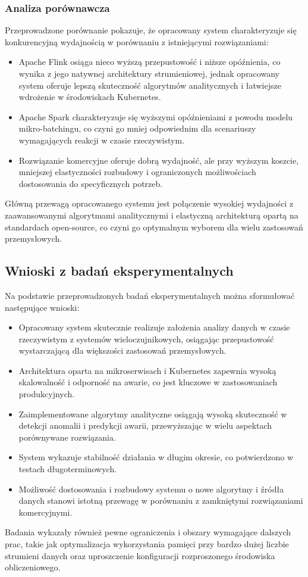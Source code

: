 \subsubsection{Analiza porównawcza}
\label{subsubsec:analiza_porownawcza}

Przeprowadzone porównanie pokazuje, że opracowany system charakteryzuje się konkurencyjną wydajnością w porównaniu z istniejącymi rozwiązaniami:

\begin{itemize}
    \item Apache Flink osiąga nieco wyższą przepustowość i niższe opóźnienia, co wynika z jego natywnej architektury strumieniowej, jednak opracowany system oferuje lepszą skuteczność algorytmów analitycznych i łatwiejsze wdrożenie w środowiskach Kubernetes.
    \item Apache Spark charakteryzuje się wyższymi opóźnieniami z powodu modelu mikro-batchingu, co czyni go mniej odpowiednim dla scenariuszy wymagających reakcji w czasie rzeczywistym.
    \item Rozwiązanie komercyjne oferuje dobrą wydajność, ale przy wyższym koszcie, mniejszej elastyczności rozbudowy i ograniczonych możliwościach dostosowania do specyficznych potrzeb.
\end{itemize}

Główną przewagą opracowanego systemu jest połączenie wysokiej wydajności z zaawansowanymi algorytmami analitycznymi i elastyczną architekturą opartą na standardach open-source, co czyni go optymalnym wyborem dla wielu zastosowań przemysłowych.

\subsection{Wnioski z badań eksperymentalnych}
\label{subsec:wnioski_z_badan}

Na podstawie przeprowadzonych badań eksperymentalnych można sformułować następujące wnioski:

\begin{itemize}
    \item Opracowany system skutecznie realizuje założenia analizy danych w czasie rzeczywistym z systemów wieloczujnikowych, osiągając przepustowość wystarczającą dla większości zastosowań przemysłowych.
    \item Architektura oparta na mikroserwisach i Kubernetes zapewnia wysoką skalowalność i odporność na awarie, co jest kluczowe w zastosowaniach produkcyjnych.
    \item Zaimplementowane algorytmy analityczne osiągają wysoką skuteczność w detekcji anomalii i predykcji awarii, przewyższając w wielu aspektach porównywane rozwiązania.
    \item System wykazuje stabilność działania w długim okresie, co potwierdzono w testach długoterminowych.
    \item Możliwość dostosowania i rozbudowy systemu o nowe algorytmy i źródła danych stanowi istotną przewagę w porównaniu z zamkniętymi rozwiązaniami komercyjnymi.
\end{itemize}

Badania wykazały również pewne ograniczenia i obszary wymagające dalszych prac, takie jak optymalizacja wykorzystania pamięci przy bardzo dużej liczbie strumieni danych oraz uproszczenie konfiguracji rozproszonego środowiska obliczeniowego. 